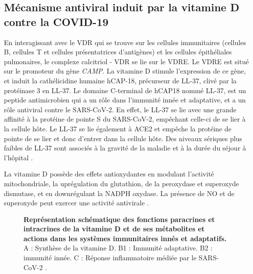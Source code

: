 \documentclass[
  a4paper,
  DIV=11,
  numbers=noendperiod,
  listof=totoc]{scrreprt}
\begin{document}
\subsection{Mécanisme antiviral induit par la vitamine D contre la
COVID-19}\label{muxe9canisme-antiviral-induit-par-la-vitamine-d-contre-la-covid-19}

En interagissant avec le \ac{VDR} qui se trouve sur les cellules
immunitaires (cellules B, cellules T et cellules présentatrices
d'antigènes) et les cellules épithéliales pulmonaires, le complexe
calcitriol - \ac{VDR} se lie sur le \ac{VDRE}. Le \ac{VDRE} est situé
sur le promoteur du gène \emph{CAMP}. La vitamine D stimule l'expression
de ce gène, et induit la cathélicidine humaine hCAP-18, précurseur de
LL-37, clivé par la protéinase 3 en LL-37. Le domaine C-terminal de
hCAP18 nommé LL-37, est un peptide antimicrobien qui a un rôle dans
l'immunité innée et adaptative, et a un rôle antiviral contre le
SARS-CoV-2. En effet, le LL-37 se lie avec une grande affinité à la
protéine de pointe S du SARS-CoV-2, empêchant celle-ci de se lier à la
cellule hôte. Le LL-37 se lie également à ACE2 et empêche la protéine de
pointe de se lier et donc d'entrer dans la cellule hôte. Des niveaux
sériques plus faibles de LL-37 sont associés à la gravité de la maladie
et à la durée du séjour à l'hôpital \autocites[ ]{Keutmann.2022}[
]{Cutuli.2024}{Shiravi.2022,Munshi.2021}.

La vitamine D possède des effets antioxydantes en modulant l'activité
mitochondriale, la uprégulation du glutathion, de la peroxydase et
superoxyde dismutase, et en downrégulant la NADPH oxydase. La présence
de NO et de superoxyde peut exercer une activité antivirale \autocites[
]{Shiravi.2022}{Contreras-Bolívar.2023}.

\begin{figure}


\caption[Représentation schématique des fonctions paracrines et
intracrines de la vitamine D et de ses métabolites et actions dans les
systèmes immunitaires innés et
adaptatifs.]{\label{fig-vd-covid-function}\textbf{Représentation
schématique des fonctions paracrines et intracrines de la vitamine D et
de ses métabolites et actions dans les systèmes immunitaires innés et
adaptatifs.} A : Synthèse de la vitamine D. B1 : Immunité adaptative. B2
: immunité innée. C : Réponse inflammatoire médiée par le SARS-CoV-2
\autocite{Contreras-Bolívar.2023}.}

\end{figure}%
\end{document}
